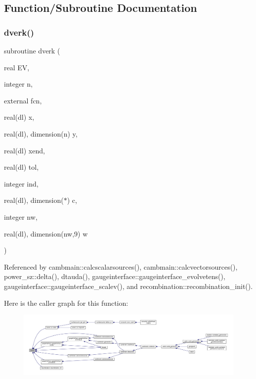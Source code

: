\subsection{Function/\+Subroutine Documentation}
\mbox{\label{subroutines_8f90_a35d319f194cbb52b3ee563ece3266ad5}} 
\subsubsection{\texorpdfstring{dverk()}{dverk()}}
{\footnotesize\ttfamily subroutine dverk (\begin{DoxyParamCaption}\item[{real}]{EV,  }\item[{integer}]{n,  }\item[{external}]{fcn,  }\item[{real(dl)}]{x,  }\item[{real(dl), dimension(n)}]{y,  }\item[{real(dl)}]{xend,  }\item[{real(dl)}]{tol,  }\item[{integer}]{ind,  }\item[{real(dl), dimension($\ast$)}]{c,  }\item[{integer}]{nw,  }\item[{real(dl), dimension(nw,9)}]{w }\end{DoxyParamCaption})}



Referenced by cambmain\+::calcscalarsources(), cambmain\+::calcvectorsources(), power\+\_\+sz\+::delta(), dtauda(), gaugeinterface\+::gaugeinterface\+\_\+evolvetens(), gaugeinterface\+::gaugeinterface\+\_\+scalev(), and recombination\+::recombination\+\_\+init().

Here is the caller graph for this function\+:
\nopagebreak
\begin{figure}[H]
\begin{center}
\leavevmode
\includegraphics[width=350pt]{subroutines_8f90_a35d319f194cbb52b3ee563ece3266ad5_icgraph}
\end{center}
\end{figure}
\mbox{\label{subroutines_8f90_adc95564e859204ebffa9612a6fcf337a}} 
